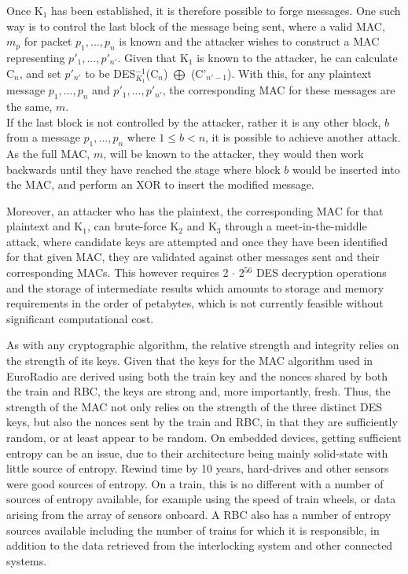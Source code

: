 \documentclass[twoside,11pt,a4paper]{article}
\begin{document}
Once K$_1$ has been established, it is therefore possible to forge messages. One such way is to control the last block of the message being sent, where a valid MAC, $m_p$ for packet $p_1 , ..., p_n$ is known and the attacker wishes to construct a MAC representing $p'_1 , ... , p'_{n'}$. Given that K$_1$ is known to the attacker, he can calculate C$_n$, and set $p'_{n'}$ to be DES$^{-1}_{K_1}$(C$_n$) $ \bigoplus $ (C'$_{n'-1}$). With this, for any plaintext message $p_1,...,p_n$ and $p'_1,...,p'_{n'}$, the corresponding MAC for these messages are the same, $m$.\\
If the last block is not controlled by the attacker, rather it is any other block, $b$ from a message $p_1,...,p_n$ where $1 \leq b < n$, it is possible to achieve another attack. As the full MAC, $m$, will be known to the attacker, they would then work backwards until they have reached the stage where block $b$ would be inserted into the MAC, and perform an XOR to insert the modified message.

Moreover, an attacker who has the plaintext, the corresponding MAC for that plaintext and K$_1$, can brute-force K$_2$ and K$_3$ through a meet-in-the-middle attack, where candidate keys are attempted and once they have been identified for that given MAC, they are validated against other messages sent and their corresponding MACs. This however requires 2 $\cdot$ 2$^{56}$ DES decryption operations and the storage of intermediate results which amounts to storage and memory requirements in the order of petabytes, which is not currently feasible without significant computational cost.

As with any cryptographic algorithm, the relative strength and integrity relies on the strength of its keys. Given that the keys for the MAC algorithm used in EuroRadio are derived using both the train key and the nonces shared by both the train and RBC, the keys are strong and, more importantly, fresh. Thus, the strength of the MAC not only relies on the strength of the three distinct DES keys, but also the nonces sent by the train and RBC, in that they are sufficiently random, or at least appear to be random. On embedded devices, getting sufficient entropy can be an issue, due to their architecture being mainly solid-state with little source of entropy. Rewind time by 10 years, hard-drives and other sensors were good sources of entropy. On a train, this is no different with a number of sources of entropy available, for example using the speed of train wheels, or data arising from the array of sensors onboard. A RBC also has a number of entropy sources available including the number of trains for which it is responsible, in addition to the data retrieved from the interlocking system and other connected systems.
\end{document}
